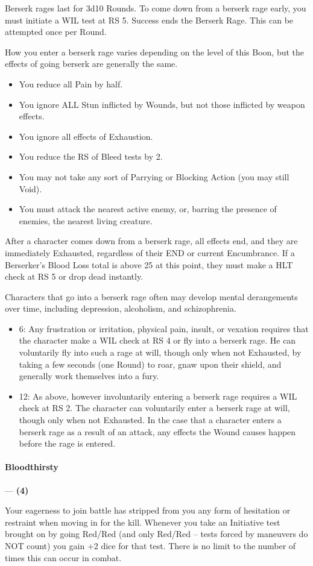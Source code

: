 \documentclass[oneside,11pt,english]{book}
\begin{document}
Berserk rages last for 3d10 Rounds. To come down from a berserk rage early, you must initiate a WIL 
test at RS 5. Success ends the Berserk Rage. This can be attempted once per Round. 


How you enter a berserk rage varies depending on the level of this Boon, but the effects of going berserk are generally the same. 
\begin{itemize}
\item You reduce all Pain by half. 
\item You ignore ALL Stun inflicted by Wounds, but not those inflicted by weapon effects. 
\item You ignore all effects of Exhaustion. 
\item You reduce the RS of Bleed tests by 2. 
\item You may not take any sort of Parrying or Blocking Action (you may still Void). 
\item You must attack the nearest active enemy, or, barring the presence of enemies, the nearest living 
creature. 
\end{itemize}
After a character comes down from a berserk rage, all effects end, and they are immediately Exhausted, 
regardless of their END or current Encumbrance. If a Berserker's Blood Loss total is above 25 at this 
point, they must make a HLT check at RS 5 or drop dead instantly. 


Characters that go into a berserk rage often may develop mental derangements over time, including 
depression, alcoholism, and schizophrenia. 
\begin{itemize}
\item 6: Any frustration or irritation, physical pain, insult, or vexation requires that the character make a WIL check at RS 4 or fly into a berserk rage. He can voluntarily fly into such a rage at will, though only when not Exhausted, by taking a few seconds (one Round) to roar, gnaw upon their shield, and generally work 
themselves into a fury.
\item 12: As above, however involuntarily entering a berserk rage requires a WIL check at RS 2. The character can voluntarily enter a berserk rage at will, though only when not Exhausted. In the case that a character enters a berserk rage as a result of an attack, any effects the Wound causes happen before the rage is entered.
\end{itemize}
\paragraph{\label{boon:Bloodthirsty}Bloodthirsty}---\quad \textbf{ (4)}\par
Your eagerness to join battle has stripped from you any form of hesitation or restraint when moving in for 
the kill. Whenever you take an Initiative test brought on by going Red/Red (and only Red/Red – tests forced by maneuvers do NOT count) you gain +2 dice for that test. There is no limit to the number of 
times this can occur in combat.
\end{document}
